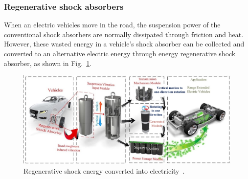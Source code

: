 

\subsubsection{Regenerative shock absorbers}

When an electric vehicles move in the road, the suspension power of the conventional shock absorbers are normally dissipated through friction and heat.
However, these wasted energy in a vehicle's shock absorber can be collected and converted to an alternative electric energy through energy regenerative shock absorber, as shown in Fig.~\ref{fig:JX_shock}.

\begin{figure}
\centering
\includegraphics[width=1.0\hsize]{Figures/Jason_Xue/JX_shock.jpg}
\caption{Regenerative shock energy converted into electricity~\cite{JX_ZHANG2016177}.}
\label{fig:JX_shock}
\end{figure}      

